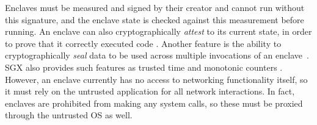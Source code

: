 

Enclaves must be measured and signed by their creator and cannot run without
this signature, and the enclave state is checked against this measurement
before running.  An enclave can also cryptographically \textit{attest} to its
current state, in order to prove that it correctly executed code
\cite{sgx_provisioning, anati2013innovative}.  Another feature is the ability
to cryptographically \textit{seal} data to be used across multiple invocations
of an enclave~\cite{anati2013innovative, sgx_sealing}.  SGX also provides such
features as trusted time and monotonic counters
\cite{sgx-linux-sdk,sgx-trusted-time}.  However, an enclave
currently has no access to networking functionality itself, so it must rely on
the untrusted application for all network interactions.  In fact, enclaves are 
prohibited from making any system calls, so these must be proxied through the
untrusted OS as well.




